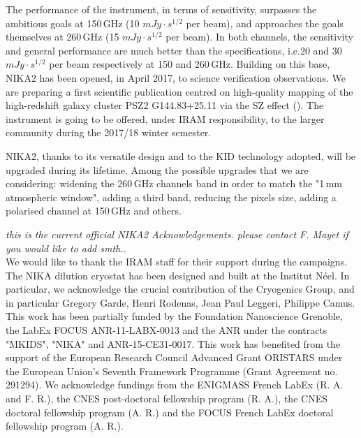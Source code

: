 \documentclass[]{aa} %
\begin{document}
The performance of the instrument, in terms of sensitivity, surpasses the ambitious goals at 150\,GHz (10 $mJy \cdot s^{1/2}$ per beam), and approaches the goals themselves at 260\,GHz (15 $mJy \cdot s^{1/2}$ per beam). In both channels, the sensitivity and general performance are much better than the specifications, i.e.20 and 30 $mJy \cdot s^{1/2}$ per beam respectively at 150 and 260\,GHz. Building on this base, NIKA2 has been opened, in April 2017, to science verification observations. We are preparing a first scientific publication centred on high-quality mapping of the high-redshift galaxy cluster PSZ2 G144.83+25.11 via the SZ effect (\cite{Ruppin2017}). The instrument is going to be offered, under IRAM responsibility, to the larger community during the 2017/18 winter semester. 

NIKA2, thanks to its versatile design and to the KID technology adopted, will be upgraded during its lifetime. Among the possible upgrades that we are considering: widening the 260\,GHz channels band in order to match the "1\,mm atmospheric window", adding a third band, reducing the pixels size, adding a polarised channel at 150\,GHz and others. 

\begin{acknowledgements}
{\it this is the current official NIKA2 Acknowledgements. please contact F.
Mayet if you would like to add smth.}.\\
We would like to thank the IRAM staff for their support during the campaigns. 
The NIKA dilution cryostat has been designed and built at the Institut N\'eel. 
In particular, we acknowledge the crucial contribution of the Cryogenics Group, and 
in particular Gregory Garde, Henri Rodenas, Jean Paul Leggeri, Philippe Camus. 
This work has been partially funded by the Foundation Nanoscience Grenoble, the LabEx FOCUS ANR-11-LABX-0013 and 
the ANR under the contracts "MKIDS", "NIKA" and ANR-15-CE31-0017. 
This work has benefited from the support of the European Research Council Advanced Grant ORISTARS 
under the European Union's Seventh Framework Programme (Grant Agreement no. 291294).
We acknowledge fundings from the ENIGMASS French LabEx (R. A. and F. R.), 
the CNES post-doctoral fellowship program (R. A.),  the CNES doctoral fellowship program (A. R.) and 
the FOCUS French LabEx doctoral fellowship program (A. R.).


\end{acknowledgements}


%
%


%
% 
\end{document}

